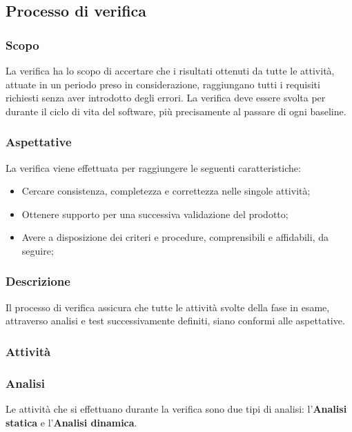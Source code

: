 \subsection{Processo di verifica}
	\subsubsection{Scopo}
		La verifica ha lo scopo di accertare che i risultati ottenuti da tutte le attività, attuate in un periodo preso in considerazione, raggiungano tutti i requisiti richiesti senza aver introdotto degli errori. La verifica deve essere svolta per durante il ciclo di vita del software, più precisamente al passare di ogni baseline\glo.
	\subsubsection{Aspettative}
		La verifica viene effettuata per raggiungere le seguenti caratteristiche:
		\begin{itemize}
			\item Cercare consistenza, completezza e correttezza nelle singole attività;
			\item Ottenere supporto per una successiva validazione del prodotto;
			\item Avere a disposizione dei criteri e procedure, comprensibili e affidabili, da seguire;
		\end{itemize}
	\subsubsection{Descrizione}
		Il processo di verifica assicura che tutte le attività svolte della fase in esame, attraverso analisi e test successivamente definiti, siano conformi alle aspettative.
	\subsubsection{Attività}
	\subsubsection{Analisi}
		 Le attività che si effettuano durante la verifica sono due tipi di analisi: l'\textbf{Analisi statica} e l'\textbf{Analisi dinamica}.
